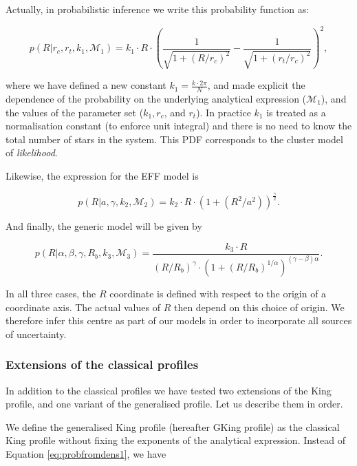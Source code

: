 Actually, in probabilistic inference we write this probability function as:

\begin{equation}
  p(R|r_c, r_t, k_1,\mathcal{M}_1)=k_1\cdot R \cdot
  \left(\frac{1}{\sqrt{1+(R/r_c)^2}} - \frac{1}{\sqrt{1+(r_t/r_c)^2}}\right)^2,
\label{eq:probfromdens1}
\end{equation}

where we have defined a new constant $k_1=\frac{k\cdot2\pi}{N}$, and made explicit the dependence of the probability on the underlying analytical expression ($\mathcal{M}_1$), and the values of the parameter set ($k_1, r_c$, and $r_t$). In practice $k_1$ is treated as a normalisation constant (to enforce unit integral) and there is no need to know the total number of stars in the system. This PDF corresponds to the cluster model of \emph{likelihood}.

Likewise, the expression for the EFF model is

\begin{equation}
  p(R|a, \gamma, k_2,\mathcal{M}_2)=k_2\cdot R \cdot (1+(R^2/a^2))^\frac{\gamma}{2}.
\label{eq:probfromdens2}
\end{equation}

And finally, the generic model will be given by

\begin{equation}
  p(R| \alpha, \beta, \gamma, R_b, k_3,\mathcal{M}_3 ) = \frac{k_3\cdot R} {(R/R_b)^{\gamma}\cdot(1+(R/R_b)^{1/\alpha})^{(\gamma-\beta)\alpha}}.
  \label{eq:probfromdens3}
\end{equation}

In all three cases, the $R$ coordinate is defined with respect to the origin of a coordinate axis. The actual values of $R$ then depend on this choice of origin. We therefore infer this centre as part of our models in order to incorporate all sources of uncertainty. 


\subsubsection{Extensions of the classical profiles}

In addition to the classical profiles we have tested two extensions of the King profile, and one variant of the generalised profile. Let us describe them in order.

We define the generalised King profile (hereafter GKing profile) as the classical King profile without fixing the exponents of the analytical expression. Instead of Equation \ref{eq:probfromdens1}, we have

